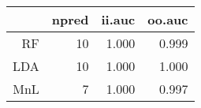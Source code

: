 \begin{table}[ht]
\centering
\begin{tabular}{rrrr}
  \hline
 & npred & ii.auc & oo.auc \\ 
  \hline
RF &   10 & 1.000 & 0.999 \\ 
  LDA &   10 & 1.000 & 1.000 \\ 
  MnL &    7 & 1.000 & 0.997 \\ 
   \hline
\end{tabular}
\label{tab:second_res}
\end{table}
